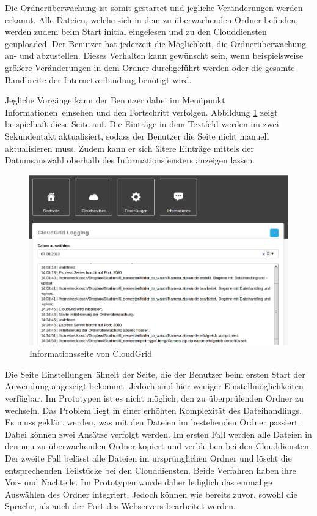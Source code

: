 Die Ordnerüberwachung ist somit gestartet und jegliche Veränderungen werden erkannt.
Alle Dateien, welche sich in dem zu überwachenden Ordner befinden, werden zudem beim Start initial eingelesen und zu den Clouddiensten geuploaded.
Der Benutzer hat jederzeit die Möglichkeit, die Ordnerüberwachung an- und abzustellen.
Dieses Verhalten kann gewünscht sein, wenn beispielsweise größere Veränderungen in dem Ordner durchgeführt werden oder die gesamte Bandbreite der Internetverbindung benötigt wird.

Jegliche Vorgänge kann der Benutzer dabei im Menüpunkt \frqq Informationen\flqq\ einsehen und den Fortschritt verfolgen.
Abbildung \ref{fig-demo-logging} zeigt beispielhaft diese Seite auf.
Die Einträge in dem Textfeld werden im zwei Sekundentakt aktualisiert, sodass der Benutzer die Seite nicht manuell aktualisieren muss.
Zudem kann er sich ältere Einträge mittels der Datumsauswahl oberhalb des Informationsfensters anzeigen lassen.

\begin{figure}[H]
  \centering
  \includegraphics[scale=0.4]{resources/Bilder_Kapitel_6/logging.png}
  \caption{Informationsseite von CloudGrid}
  \label{fig-demo-logging}
\end{figure}

Die Seite \frqq Einstellungen\flqq\ ähnelt der Seite, die der Benutzer beim ersten Start der Anwendung angezeigt bekommt.
Jedoch sind hier weniger Einstellmöglichkeiten verfügbar.
Im Prototypen ist es nicht möglich, den zu überprüfenden Ordner zu wechseln.
Das Problem liegt in einer erhöhten Komplexität des Dateihandlings.
Es muss geklärt werden, was mit den Dateien im bestehenden Ordner passiert.
Dabei können zwei Ansätze verfolgt werden.
Im ersten Fall werden alle Dateien in den neu zu überwachenden Ordner kopiert und verbleiben bei den Clouddiensten.
Der zweite Fall belässt alle Dateien im ursprünglichen Ordner und löscht die entsprechenden Teilstücke bei den Clouddiensten.
Beide Verfahren haben ihre Vor- und Nachteile.
Im Prototypen wurde daher lediglich das einmalige Auswählen des Ordner integriert.
Jedoch können wie bereits zuvor, sowohl die Sprache, als auch der Port des Webservers bearbeitet werden.

